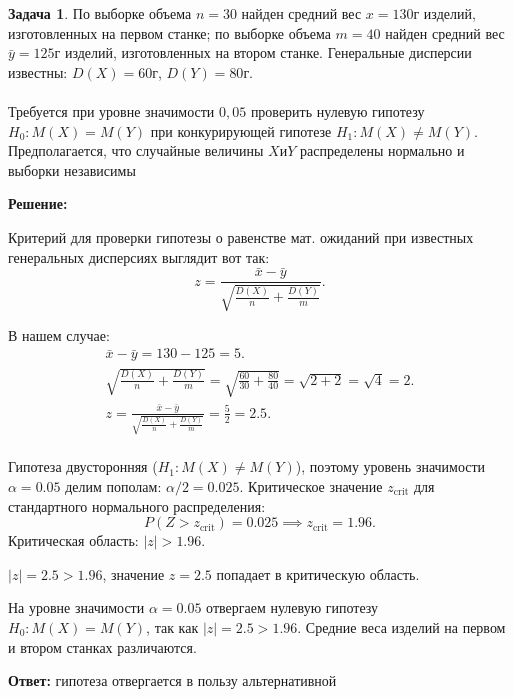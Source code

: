\documentclass[a4paper,11pt]{article}
\newenvironment{shdd}{\begin{mdframed}[backgroundcolor=shadecolor]}{\end{mdframed}}
\theoremstyle{definition}
\newtheorem{problem}{Задача}\setlength{\parindent}{0pt}
\newenvironment{solution}
{\begin{shdd}
     \textbf{Решение:}\par\setlength{\parindent}{0pt}}
     {
\end{shdd}}
\newenvironment{answer}
{\par\noindent\textbf{Ответ:}}
{\par}
\begin{document}
    \vspace{10pt}
    \begin{problem}
        По выборке объема \(n = 30\) найден средний вес \(x = 130\)г изделий, изготовленных на
        первом станке; по выборке объема \(m = 40\) найден средний вес \(\bar{y} = 125\)г изделий,
        изготовленных на втором станке.
        Генеральные дисперсии известны: \(D(X) = 60\)г, \(D(Y) = 80\)г.
        \\
        \\
        Требуется при уровне значимости \(0,05\) проверить нулевую гипотезу \(H_0 : M(X) = M(Y)\)
        при конкурирующей гипотезе \(H_1 : M(X) \neq M(Y)\).
        Предполагается, что случайные величины \(X\)и\(Y\) распределены нормально и выборки независимы

        \begin{solution}
            Критерий для проверки гипотезы о равенстве
            мат. ожиданий при известных генеральных дисперсиях выглядит вот так:
            \[
                z = \frac{\bar{x} - \bar{y}}{\sqrt{\frac{D(X)}{n} + \frac{D(Y)}{m}}}.
            \]

            В нашем случае:
            \begin{gather*}
                \bar{x} - \bar{y} = 130 - 125 = 5.\\
                \sqrt{\frac{D(X)}{n} + \frac{D(Y)}{m}} = \sqrt{\frac{60}{30} + \frac{80}{40}} = \sqrt{2 + 2} = \sqrt{4} = 2.\\
                z = \frac{\bar{x} - \bar{y}}{\sqrt{\frac{D(X)}{n} + \frac{D(Y)}{m}}} = \frac{5}{2} = 2.5.\\
            \end{gather*}

            Гипотеза двусторонняя (\(H_1: M(X) \neq M(Y)\)), поэтому уровень значимости \(\alpha = 0.05\) делим пополам: \(\alpha/2 = 0.025\).
            Критическое значение \(z_{\text{crit}}\) для стандартного нормального распределения:
            \[
                P(Z > z_{\text{crit}}) = 0.025 \implies z_{\text{crit}} = 1.96.
            \]
            Критическая область: \(|z| > 1.96\).

            \(|z| = 2.5 > 1.96\), значение \(z = 2.5\) попадает в критическую область.

            На уровне значимости \(\alpha = 0.05\) отвергаем нулевую гипотезу \(H_0: M(X) = M(Y)\), так как \(|z| = 2.5 > 1.96\).
            Средние веса изделий на первом и втором станках различаются.
        \end{solution}

        \begin{answer}
            гипотеза отвергается в пользу альтернативной
        \end{answer}

    \end{problem}
\end{document}
